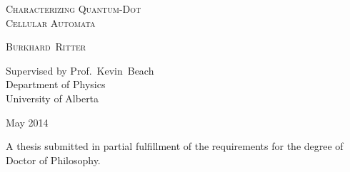 \begin{titlepage}
  \begin{center}
      \large  

      \hfill
      \vfill

      \begingroup
          \textsc{\huge Characterizing Quantum-Dot\\Cellular Automata} \\ \bigskip
      \endgroup

      \textsc{\Large Burkhard~Ritter}

      \vfill

      Supervised by Prof.~Kevin~Beach \\
      Department of Physics\\
      University of Alberta \\ \bigskip

      May 2014

      \vfill
      
      \small{A thesis submitted in partial fulfillment of the requirements for the
      degree of Doctor of Philosophy.}
  \end{center}  
\end{titlepage}   
